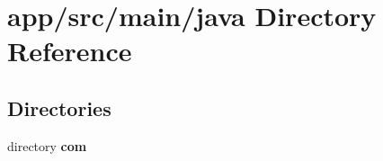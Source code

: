 \section{app/src/main/java Directory Reference}
\label{dir_eb2abb23009e5bb768d3c51d96109dc3}
\subsection*{Directories}
\begin{DoxyCompactItemize}
\item 
directory {\bf com}
\end{DoxyCompactItemize}
